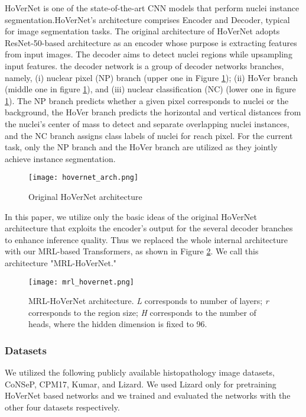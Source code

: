 \documentclass{article}
\begin{document}
HoVerNet is one of the state-of-the-art CNN models that perform nuclei instance segmentation.HoVerNet's architecture comprises Encoder and Decoder, typical for image segmentation tasks.
The original architecture of HoVerNet adopts ResNet-50-based architecture as an encoder whose purpose is extracting features from input images.
The decoder aims to detect nuclei regions while upsampling input features. the decoder network is a group of decoder networks branches, namely, (i) nuclear pixel (NP) branch (upper one in Figure \ref{fig:hovernet_arch}); (ii) HoVer branch (middle one in figure \ref{fig:hovernet_arch}), and (iii) nuclear classification (NC) (lower one in figure \ref{fig:hovernet_arch}). The NP branch predicts whether a given pixel corresponds to nuclei or the background, the HoVer branch predicts the horizontal and vertical distances from the nuclei's center of mass to detect and separate overlapping nuclei instances, and the NC branch assigns class labels of nuclei for reach pixel. For the current task, only the NP branch and the HoVer branch are utilized as they jointly achieve instance segmentation.

\begin{figure}[ht]
    \centering
    \texttt{[image: hovernet\_arch.png]}
    \caption{Original HoVerNet architecture}\label{fig:hovernet_arch}
\end{figure}

In this paper, we utilize only the basic ideas of the original HoVerNet architecture that exploits the encoder's output for the several decoder branches to enhance inference quality.
Thus we replaced the whole internal architecture with our MRL-based Transformers, as shown in Figure \ref{fig:MRL_hovernet_arch}. We call this architecture "MRL-HoVerNet."

\begin{figure}[ht]
    \centering
    \texttt{[image: mrl\_hovernet.png]}
    \caption{MRL-HoVerNet architecture. \textit{L} corresponds to number of layers; \textit{r} corresponds to the region size; \textit{H} corresponds to the number of heads, where the hidden dimension is fixed to 96.}\label{fig:MRL_hovernet_arch}
\end{figure}

\subsubsection{Datasets} \label{appendix:datasets}

We utilized the following publicly available histopathology image datasets, CoNSeP\cite{DBLP:journals/corr/hovernet}, CPM17\cite{CPM17}, Kumar\cite{kumar}, and Lizard\cite{graham2021lizard}. We used Lizard only for pretraining HoVerNet based networks and we trained and evaluated the networks with the other four datasets respectively.
\end{document}
